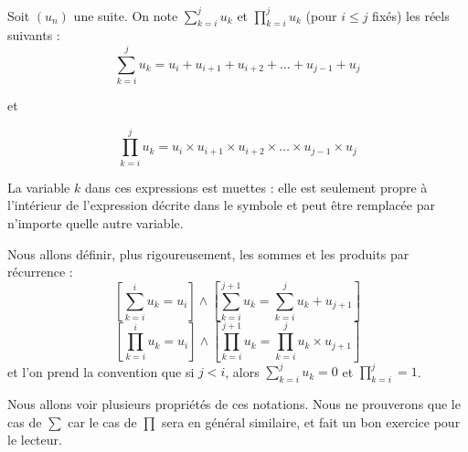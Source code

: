 \begin{defi}
    Soit $(u_n)$ une suite. On note $\sum_{k=i}^j u_k$ et $\prod_{k=i}^j u_k$ (pour $i \leq j$ fixés) les réels suivants :
    $$\sum_{k=i}^j u_k = u_i + u_{i+1}+ u_{i+2}+\ldots + u_{j-1}+u_j$$ \begin{center} et \end{center} $$\prod_{k=i}^j u_k =  u_i \times u_{i+1}\times u_{i+2}\times \ldots \times u_{j-1}\times u_j$$
    
    La variable $k$ dans ces expressions est muettes : elle est seulement propre à l'intérieur de l'expression décrite dans le symbole et peut être remplacée par n'importe quelle autre variable.
    
    Nous allons définir, plus rigoureusement, les sommes et les produits par récurrence :
    $$\left[\sum_{k=i}^i u_k = u_i\right] \land \left[\sum_{k=i}^{j+1}u_k=\sum_{k=i}^j u_k + u_{j+1} \right]$$
    $$\left[\prod_{k=i}^i u_k = u_i\right] \land \left[\prod_{k=i}^{j+1}u_k=\prod_{k=i}^j u_k \times u_{j+1} \right]$$ et l'on prend la convention que si $j<i$, alors $\sum_{k=i}^j u_k=0$ et $\prod_{k=i}^j = 1$.
\end{defi}

Nous allons voir plusieurs propriétés de ces notations. Nous ne prouverons que le cas de $\sum$ car le cas de $\prod$ sera en général similaire, et fait un bon exercice pour le lecteur.

